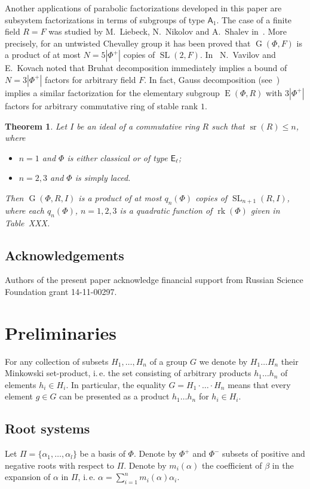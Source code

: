 \documentclass[12pt]{amsart}
\numberwithin{equation}{section}
\newcounter{thmcounter} \newcounter{lemmacounter}
\newtheorem{thm}[thmcounter]{Theorem}
\theoremstyle{definition}
\DeclareMathOperator{\G}{G}
\DeclareMathOperator{\SL}{SL}
\DeclareMathOperator{\E}{E}
\DeclareMathOperator{\sr}{sr}
\DeclareMathOperator{\rk}{rk}
\newcommand{\rA}{\mathsf{A}}
\newcommand{\rE}{\mathsf{E}}
\begin{document}
Another applications of parabolic factorizations developed in this paper are subsystem factorizations in terms of subgroups of type $\rA_1$.
The case of a finite field $R=F$ was studied by M.~Liebeck, N.~Nikolov and A.~Shalev in~\cite{NikProdDecomp}.
More precisely, for an untwisted Chevalley group it has been proved that $\G(\Phi, F)$ is a product of at most $N=5|\Phi^+|$ copies of $\SL(2, F)$.
In~\cite{VavKovSL2} N.~Vavilov and E.~Kovach noted that Bruhat decomposition immediately implies a bound of $N=3|\Phi^+|$ factors for arbitrary field $F$.
In fact, Gauss decomposition (see~\cite{Sm12}) implies a similar factorization for the elementary subgroup $\E(\Phi, R)$ with $3|\Phi^+|$ factors for arbitrary commutative ring of stable rank $1$.

\begin{thm} Let $I$ be an ideal of a commutative ring $R$ such that $\sr(R)\leq n$, where
\begin{itemize}
 \item $n=1$ and $\Phi$ is either classical or of type $\rE_\ell$;
 \item $n=2, 3$ and $\Phi$ is simply laced.
\end{itemize}
Then $\G(\Phi, R, I)$ is a product of at most $q_{n}(\Phi)$ copies of $\SL_{n+1}(R, I)$, where each $q_{n}(\Phi)$, $n=1,2,3$ is a quadratic function of $\rk(\Phi)$ given in Table~XXX.
\end{thm}


\subsection{Acknowledgements}
Authors of the present paper acknowledge financial support from Russian Science Foundation grant 14-11-00297.

\section{Preliminaries}\label{sec:prelim}
For any collection of subsets $H_1,\ldots, H_n$ of a group $G$ we denote by $H_1\ldots H_n$ their Minkowski set-product,
i.\,e. the set consisting of arbitrary products $h_1\ldots h_n$ of elements $h_i\in H_i$. In particular, the equality
$G = H_1\cdot\ldots\cdot H_n$ means that every element $g\in G$ can be presented as a product $h_1\ldots h_n$ for $h_i\in H_i$.

\subsection{Root systems}
Let $\Pi=\{\alpha_1, \ldots, \alpha_l\}$ be a basis of $\Phi$. Denote by $\Phi^+$ and $\Phi^-$ subsets of positive and negative roots with respect to $\Pi$.
Denote by $m_i(\alpha)$ the coefficient of $\beta$ in the expansion of $\alpha$ in $\Pi$, i.\,e. $\alpha = \sum_{i=1}^n m_i(\alpha) \alpha_i$.
\end{document}
